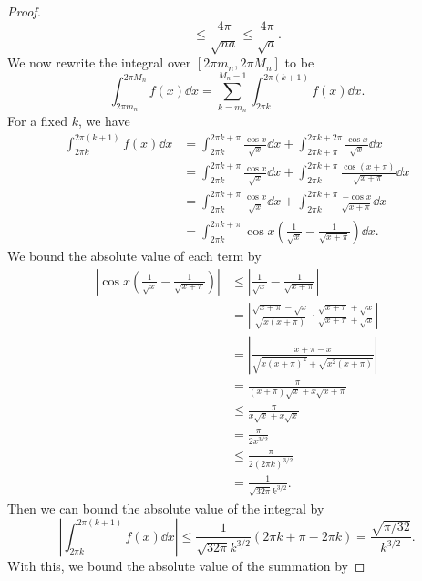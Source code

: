 \documentclass[12pt]{article}
\theoremstyle{definition}
\begin{document}
\begin{proof}
\[            \leq \frac{4\pi}{\sqrt{na}}
            \leq \frac{4\pi}{\sqrt{a}}.
    \]
    We now rewrite the integral over $[2\pi m_n, 2\pi M_n]$ to be
    \[
        \int_{2\pi m_n}^{2\pi M_n} f(x) \dd{x}
            = \sum_{k=m_n}^{M_n-1} \int_{2\pi k}^{2\pi(k+1)} f(x) \dd{x}.
    \]
    For a fixed $k$, we have
    \begin{align*}
        \int_{2\pi k}^{2\pi(k+1)} f(x) \dd{x}
            &= \int_{2\pi k}^{2\pi k + \pi} \frac{\cos x}{\sqrt{x}} \dd{x}
                + \int_{2\pi k + \pi}^{2\pi k + 2\pi} \frac{\cos x}{\sqrt{x}} \dd{x} \\
            &= \int_{2\pi k}^{2\pi k + \pi} \frac{\cos x}{\sqrt{x}} \dd{x}
                + \int_{2\pi k}^{2\pi k + \pi} \frac{\cos(x + \pi)}{\sqrt{x + \pi}} \dd{x} \\
            &= \int_{2\pi k}^{2\pi k + \pi} \frac{\cos x}{\sqrt{x}} \dd{x}
                + \int_{2\pi k}^{2\pi k + \pi} \frac{-\cos x}{\sqrt{x + \pi}} \dd{x} \\
                &= \int_{2\pi k}^{2\pi k + \pi} \cos x \left(\frac{1}{\sqrt{x}} - \frac{1}{\sqrt{x + \pi}}\right) \dd{x}.
    \end{align*}
    We bound the absolute value of each term by
    \begin{align*}
        \left|\cos x \left(\frac{1}{\sqrt{x}} - \frac{1}{\sqrt{x + \pi}}\right)\right|
            &\leq \left|\frac{1}{\sqrt{x}} - \frac{1}{\sqrt{x + \pi}}\right| \\
            &= \left|\frac{\sqrt{x + \pi} - \sqrt{x}}{\sqrt{x(x+\pi)}} \cdot \frac{\sqrt{x+\pi} + \sqrt{x}}{\sqrt{x+\pi} + \sqrt{x}}\right| \\
            &= \left|\frac{x + \pi - x}{\sqrt{x(x+\pi)^2} + \sqrt{x^2(x+\pi)}}\right| \\
            &= \frac{\pi}{(x+\pi)\sqrt{x} + x\sqrt{x+\pi}} \\
            &\leq \frac{\pi}{x\sqrt{x} + x\sqrt{x}} \\
            &= \frac{\pi}{2x^{3/2}} \\
            &\leq \frac{\pi}{2 (2\pi k)^{3/2}} \\
            &= \frac{1}{\sqrt{32\pi} k^{3/2}}.
    \end{align*}
    Then we can bound the absolute value of the integral by
    \[
        \left|\int_{2\pi k}^{2\pi(k+1)} f(x) \dd{x}\right|
            \leq \frac{1}{\sqrt{32\pi} k^{3/2}}(2\pi k + \pi - 2\pi k)
            = \frac{\sqrt{\pi/32}}{k^{3/2}}.
    \]
    With this, we bound the absolute value of the summation by

\end{proof}
\end{document}
